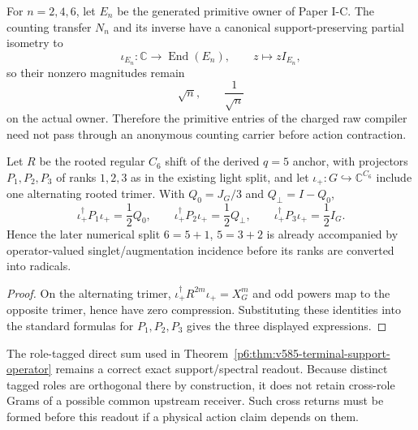 \documentclass[12pt,a4paper]{article}
\begin{document}
\begin{proposition}
\label{p6:prop:v588-primitive-owner-lift}
For $n=2,4,6$, let $E_n$ be the generated primitive owner of Paper I-C.
The counting transfer $N_n$ and its inverse have a canonical support-preserving
partial isometry to
\[
 \iota_{E_n}:\mathbb C\to\operatorname{End}(E_n),\qquad z\mapsto zI_{E_n},
\]
so their nonzero magnitudes remain
\[
 \sqrt n,\qquad \frac1{\sqrt n}
\]
on the actual owner.  Therefore the primitive entries of the charged raw
compiler need not pass through an anonymous counting carrier before action
contraction.
\end{proposition}

\begin{proposition}[$q=5$ light split retains family incidence before rank readout]
\label{p6:prop:v588-q5-split-family-incidence}
Let $R$ be the rooted regular $C_6$ shift of the derived $q=5$ anchor, with
projectors $P_1,P_2,P_3$ of ranks $1,2,3$ as in the existing light split, and
let $\iota_+:G\hookrightarrow\mathbb C^{C_6}$ include one alternating rooted
trimer.  With $Q_0=J_G/3$ and $Q_\perp=I-Q_0$,
\[
 \boxed{
 \iota_+^\dagger P_1\iota_+=\frac12Q_0,\qquad
 \iota_+^\dagger P_2\iota_+=\frac12Q_\perp,\qquad
 \iota_+^\dagger P_3\iota_+=\frac12I_G.}
\]
Hence the later numerical split $6=5+1$, $5=3+2$ is already accompanied by
operator-valued singlet/augmentation incidence before its ranks are converted
into radicals.
\end{proposition}

\begin{proof}
On the alternating trimer,
$\iota_+^\dagger R^{2m}\iota_+=X_G^m$ and odd powers map to the opposite
trimer, hence have zero compression.  Substituting these identities into the
standard formulas for $P_1,P_2,P_3$ gives the three displayed expressions.
\end{proof}

\begin{remark}
\label{p6:rem:v588-direct-sum-firewall}
The role-tagged direct sum used in
Theorem~\ref{p6:thm:v585-terminal-support-operator} remains a correct exact
support/spectral readout.  Because distinct tagged roles are orthogonal there
by construction, it does not retain cross-role Grams of a possible common
upstream receiver.  Such cross returns must be formed before this readout if a
physical action claim depends on them.
\end{remark}
\end{document}
